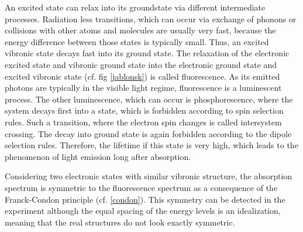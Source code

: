 \documentclass[a4paper]{scrartcl}
\numberwithin{equation}{section}
\numberwithin{figure}{section}
\numberwithin{table}{section}
\begin{document}
An excited state can relax into its groundstate via different intermediate processes. Radiation less transitions, which can occur via exchange of phonons or collisions with other atoms and molecules are usually very fast, because the energy difference between those states is typically small. Thus, an excited vibronic state decays fast into its ground state. The relaxation of the electronic excited state and vibronic ground state into the electronic ground state and excited vibronic state (cf. fig \ref{jablonsk}) is called fluorescence. As its emitted photons are typically in the visible light regime, fluorescence is a luminescent process. The other luminescence, which can occur is phosphorescence, where the system decays first into a state, which is forbidden according to spin selection rules. Such a transition, where the electron spin changes is called intersystem crossing. The decay into ground state is again forbidden according to the dipole selection rules. Therefore, the lifetime if this state is very high, which leads to the phenomenon of light emission long after absorption.

Considering two electronic states with similar vibronic structure, the absorption spectrum is symmetric to the fluorescence spectrum as a consequence of the Franck-Condon principle (cf. \ref{condon}). This symmetry can be detected in the experiment although the equal spacing of the energy levels is an idealization, meaning that the real structures do not look exactly symmetric.
\end{document}
